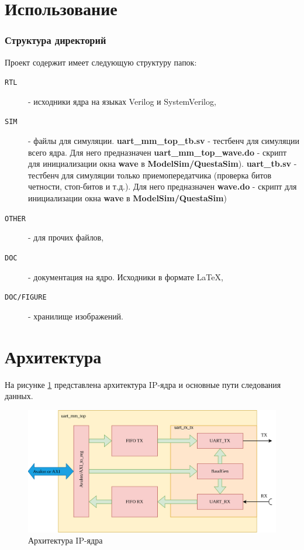 \documentclass[a4paper,12pt]{article}
\begin{document}
\newpage
\section{Использование}
\subsubsection{Структура директорий}
  Проект содержит имеет следующую структуру папок:


\begin{description}
    \item[\texttt{RTL}] - исходники ядра на языках Verilog и SystemVerilog,
    \item[\texttt{SIM}] - файлы для симуляции. \textbf{uart\_mm\_top\_tb.sv} - тестбенч для симуляции всего ядра. Для него предназначен \textbf{uart\_mm\_top\_wave.do} - скрипт для инициализации окна \textbf{wave} в \textbf{ModelSim/QuestaSim}). \textbf{uart\_tb.sv} - тестбенч для симуляции только приемопередатчика (проверка битов четности, стоп-битов и т.д.). Для него предназначен \textbf{wave.do} - скрипт для инициализации окна \textbf{wave} в \textbf{ModelSim/QuestaSim})
    \item[\texttt{OTHER}] - для прочих файлов,
    \item[\texttt{DOC}] - документация на ядро. Исходники в формате \LaTeX,
    \item[\texttt{DOC/FIGURE}] - хранилище изображений.
\end{description}

\newpage
\section{Архитектура}

На рисунке \ref{img:design_ip} представлена архитектура IP-ядра и основные пути следования данных.

    \begin{figure}[H]
        \centering
        \includegraphics[width=15cm]{DesignIP.png}
        \caption{Архитектура IP-ядра}
        \label{img:design_ip}
    \end{figure}
\end{document}
